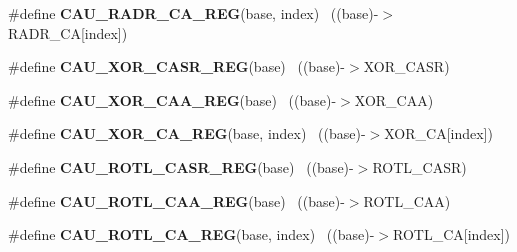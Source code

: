 \begin{DoxyCompactItemize}
\item 
\hypertarget{group___c_a_u___register___accessor___macros_ga4d76de9639a4c1d7bd35ef5cb98ce18b}{}\#define {\bfseries C\+A\+U\+\_\+\+R\+A\+D\+R\+\_\+\+C\+A\+\_\+\+R\+E\+G}(base,  index)                        ~((base)-\/$>$R\+A\+D\+R\+\_\+\+C\+A\mbox{[}index\mbox{]})\label{group___c_a_u___register___accessor___macros_ga4d76de9639a4c1d7bd35ef5cb98ce18b}

\item 
\hypertarget{group___c_a_u___register___accessor___macros_gaa62f5a12346da8115905e0846f06f229}{}\#define {\bfseries C\+A\+U\+\_\+\+X\+O\+R\+\_\+\+C\+A\+S\+R\+\_\+\+R\+E\+G}(base)                                  ~((base)-\/$>$X\+O\+R\+\_\+\+C\+A\+S\+R)\label{group___c_a_u___register___accessor___macros_gaa62f5a12346da8115905e0846f06f229}

\item 
\hypertarget{group___c_a_u___register___accessor___macros_ga27e50b815bf51205630b7aa3cc3e5cc1}{}\#define {\bfseries C\+A\+U\+\_\+\+X\+O\+R\+\_\+\+C\+A\+A\+\_\+\+R\+E\+G}(base)                                    ~((base)-\/$>$X\+O\+R\+\_\+\+C\+A\+A)\label{group___c_a_u___register___accessor___macros_ga27e50b815bf51205630b7aa3cc3e5cc1}

\item 
\hypertarget{group___c_a_u___register___accessor___macros_ga16006a0be613af364ac467529b919a3a}{}\#define {\bfseries C\+A\+U\+\_\+\+X\+O\+R\+\_\+\+C\+A\+\_\+\+R\+E\+G}(base,  index)                          ~((base)-\/$>$X\+O\+R\+\_\+\+C\+A\mbox{[}index\mbox{]})\label{group___c_a_u___register___accessor___macros_ga16006a0be613af364ac467529b919a3a}

\item 
\hypertarget{group___c_a_u___register___accessor___macros_ga35a4e34362a634d39263af07e3ed25b1}{}\#define {\bfseries C\+A\+U\+\_\+\+R\+O\+T\+L\+\_\+\+C\+A\+S\+R\+\_\+\+R\+E\+G}(base)                                ~((base)-\/$>$R\+O\+T\+L\+\_\+\+C\+A\+S\+R)\label{group___c_a_u___register___accessor___macros_ga35a4e34362a634d39263af07e3ed25b1}

\item 
\hypertarget{group___c_a_u___register___accessor___macros_gaf009d76a5b7db6618b6feafa5a5eaa4a}{}\#define {\bfseries C\+A\+U\+\_\+\+R\+O\+T\+L\+\_\+\+C\+A\+A\+\_\+\+R\+E\+G}(base)                                  ~((base)-\/$>$R\+O\+T\+L\+\_\+\+C\+A\+A)\label{group___c_a_u___register___accessor___macros_gaf009d76a5b7db6618b6feafa5a5eaa4a}

\item 
\hypertarget{group___c_a_u___register___accessor___macros_gad1acb853d34f7499b39339b4b52a0842}{}\#define {\bfseries C\+A\+U\+\_\+\+R\+O\+T\+L\+\_\+\+C\+A\+\_\+\+R\+E\+G}(base,  index)                        ~((base)-\/$>$R\+O\+T\+L\+\_\+\+C\+A\mbox{[}index\mbox{]})\label{group___c_a_u___register___accessor___macros_gad1acb853d34f7499b39339b4b52a0842}


\end{DoxyCompactItemize}
